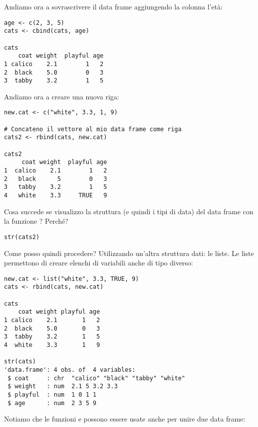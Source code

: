 \noindent Andiamo ora a sovrascrivere il data frame aggiungendo la colonna l'et\`a:

\begin{lstlisting}[style=Rstyle]
age <- c(2, 3, 5)
cats <- cbind(cats, age)

cats
    coat weight  playful age
1 calico    2.1        1   2
2  black    5.0        0   3
3  tabby    3.2        1   5
\end{lstlisting}
%
Andiamo ora a creare una nuova riga:

\begin{lstlisting}[style=Rstyle]
new.cat <- c("white", 3.3, 1, 9)

# Concateno il vettore al mio data frame come riga
cats2 <- rbind(cats, new.cat)

cats2
     coat weight  playful age
1  calico    2.1        1   2
2   black      5        0   3
3   tabby    3.2        1   5
4   white    3.3     TRUE   9
\end{lstlisting}


\vspace{0.5cm} 

\begin{exercise}\label{ex3.2}

\noindent Cosa succede se visualizzo la struttura (e quindi i tipi di data) del data frame  con la funzione ? Perch\'e?

\begin{lstlisting}[style=Rstyle]	
str(cats2)
\end{lstlisting}

\end{exercise}

\noindent Come posso quindi procedere? Utilizzando un'altra struttura dati: le liste. Le liste permettono di creare elenchi di variabili anche di tipo diverso:

\begin{lstlisting}[style=Rstyle]
new.cat <- list("white", 3.3, TRUE, 9)
cats <- rbind(cats, new.cat)

cats
    coat weight playful age
1 calico    2.1       1   2
2  black    5.0       0   3
3  tabby    3.2       1   5
4  white    3.3       1   9

str(cats)
'data.frame': 4 obs. of  4 variables:
 $ coat     : chr  "calico" "black" "tabby" "white"
 $ weight   : num  2.1 5 3.2 3.3
 $ playful  : num  1 0 1 1
 $ age      : num  2 3 5 9
\end{lstlisting}
%
Notiamo che le funzioni  e  possono essere usate anche per unire due data frame:

